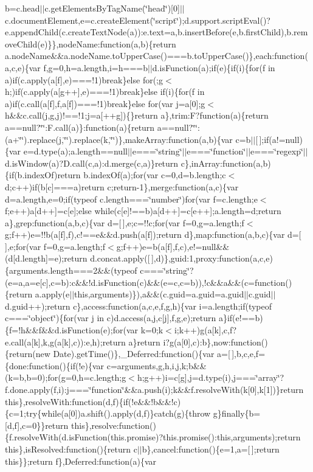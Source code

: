 \begin{DoxyCompactItemize}
b=c.\-head$|$$|$c.\-get\-Elements\-By\-Tag\-Name(\char`\"{}head\char`\"{})[0]$|$$|$c.\-document\-Element,e=c.\-create\-Element(\char`\"{}script\char`\"{});d.\-support.\-script\-Eval()?e.\-append\-Child(c.\-create\-Text\-Node(a))\-:e.\-text=a,b.\-insert\-Before(e,b.\-first\-Child),b.\-remove\-Child(e)\}\},node\-Name\-:function(a,b)\{return a.\-node\-Name\&\&a.\-node\-Name.\-to\-Upper\-Case()===b.\-to\-Upper\-Case()\},each\-:function(a,c,e)\{var f,g=0,h=a.\-length,i=h===b$|$$|$d.\-is\-Function(a);if(e)\{if(i)\{for(f in a)if(c.\-apply(a[f],e)===!1)break\}else for(;g$<$h;)if(c.\-apply(a[g++],e)===!1)break\}else if(i)\{for(f in a)if(c.\-call(a[f],f,a[f])===!1)break\}else for(var j=a[0];g$<$h\&\&c.\-call(j,g,j)!==!1;j=a[++g])\{\}return a\},trim\-:\-F?function(a)\{return a==null?\char`\"{}\char`\"{}\-:\-F.\-call(a)\}\-:function(a)\{return a==null?\char`\"{}\char`\"{}\-:(a+\char`\"{}\char`\"{}).\-replace(j,\char`\"{}\char`\"{}).\-replace(k,\char`\"{}\char`\"{})\},make\-Array\-:function(a,b)\{var c=b$|$$|$[$\,$];if(a!=null)\{var e=d.\-type(a);a.\-length==null$|$$|$e===\char`\"{}string\char`\"{}$|$$|$e===\char`\"{}function\char`\"{}$|$$|$e===\char`\"{}regexp\char`\"{}$|$$|$d.\-is\-Window(a)?\-D.\-call(c,a)\-:d.\-merge(c,a)\}return c\},in\-Array\-:function(a,b)\{if(b.\-index\-Of)return b.\-index\-Of(a);for(var c=0,d=b.\-length;c$<$d;c++)if(b[c]===a)return c;return-\/1\},merge\-:function(a,c)\{var d=a.\-length,e=0;if(typeof c.\-length===\char`\"{}number\char`\"{})for(var f=c.\-length;e$<$f;e++)a[d++]=c[e];else while(c[e]!==b)a[d++]=c[e++];a.\-length=d;return a\},grep\-:function(a,b,c)\{var d=[$\,$],e;c=!!c;for(var f=0,g=a.\-length;f$<$g;f++)e=!!b(a[f],f),c!==e\&\&d.\-push(a[f]);return d\},map\-:function(a,b,c)\{var d=[$\,$],e;for(var f=0,g=a.\-length;f$<$g;f++)e=b(a[f],f,c),e!=null\&\&(d[d.\-length]=e);return d.\-concat.\-apply([$\,$],d)\},guid\-:1,proxy\-:function(a,c,e)\{arguments.\-length===2\&\&(typeof c===\char`\"{}string\char`\"{}?(e=a,a=e[c],c=b)\-:c\&\&!d.\-is\-Function(c)\&\&(e=c,c=b)),!c\&\&a\&\&(c=function()\{return a.\-apply(e$|$$|$this,arguments)\}),a\&\&(c.\-guid=a.\-guid=a.\-guid$|$$|$c.\-guid$|$$|$d.\-guid++);return c\},access\-:function(a,c,e,f,g,h)\{var i=a.\-length;if(typeof c===\char`\"{}object\char`\"{})\{for(var j in c)d.\-access(a,j,c[j],f,g,e);return a\}if(e!==b)\{f=!h\&\&f\&\&d.\-is\-Function(e);for(var k=0;k$<$i;k++)g(a[k],c,f?e.\-call(a[k],k,g(a[k],c))\-:e,h);return a\}return i?g(a[0],c)\-:b\},now\-:function()\{return(new Date).\-get\-Time()\},\-\_\-\-Deferred\-:function()\{var a=[$\,$],b,c,e,f=\{done\-:function()\{if(!e)\{var c=arguments,g,h,i,j,k;b\&\&(k=b,b=0);for(g=0,h=c.\-length;g$<$h;g++)i=c[g],j=d.\-type(i),j===\char`\"{}array\char`\"{}?f.\-done.\-apply(f,i)\-:j===\char`\"{}function\char`\"{}\&\&a.\-push(i);k\&\&f.\-resolve\-With(k[0],k[1])\}return this\},resolve\-With\-:function(d,f)\{if(!e\&\&!b\&\&!c)\{c=1;try\{while(a[0])a.\-shift().\-apply(d,f)\}catch(g)\{throw g\}finally\{b=[d,f],c=0\}\}return this\},resolve\-:function()\{f.\-resolve\-With(d.\-is\-Function(this.\-promise)?this.\-promise()\-:this,arguments);return this\},is\-Resolved\-:function()\{return c$|$$|$b\},cancel\-:function()\{e=1,a=[$\,$];return this\}\};return f\},\-Deferred\-:function(a)\{var 
\end{DoxyCompactItemize}
